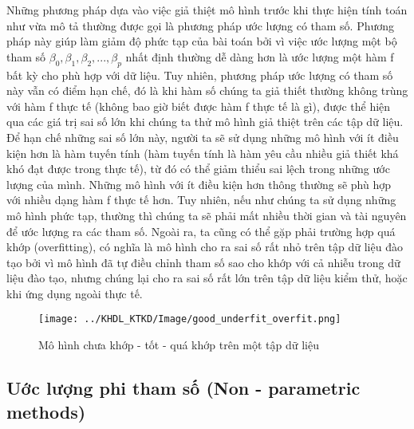 \documentclass[
]{article}
\begin{document}
Những phương pháp dựa vào việc giả thiệt mô hình trước khi thực hiện tính toán như vừa mô tả thường được gọi là phương pháp ước lượng có tham số. Phương pháp này giúp làm giảm độ phức tạp của bài toán bởi vì việc ước lượng một bộ tham số \(\beta_0, \beta_1, \beta_2, ... , \beta_p\) nhất định thường dễ dàng hơn là ước lượng một hàm f bất kỳ cho phù hợp với dữ liệu. Tuy nhiên, phương pháp ước lượng có tham số này vẫn có điểm hạn chế, đó là khi hàm số chúng ta giả thiết thường không trùng với hàm f thực tế (không bao giờ biết được hàm f thực tế là gì), được thể hiện qua các giá trị sai số lớn khi chúng ta thử mô hình giả thiệt trên các tập dữ liệu. Để hạn chế những sai số lớn này, người ta sẽ sử dụng những mô hình với ít điều kiện hơn là hàm tuyến tính (hàm tuyến tính là hàm yêu cầu nhiều giả thiết khá khó đạt được trong thực tế), từ đó có thể giảm thiểu sai lệch trong những ước lượng của mình. Những mô hình với ít điều kiện hơn thông thường sẽ phù hợp với nhiều dạng hàm f thực tế hơn. Tuy nhiên, nếu như chúng ta sử dụng những mô hình phức tạp, thường thì chúng ta sẽ phải mất nhiều thời gian và tài nguyên để ước lượng ra các tham số. Ngoài ra, ta cũng có thể gặp phải trường hợp quá khớp (overfitting), có nghĩa là mô hình cho ra sai số rất nhỏ trên tập dữ liệu đào tạo bởi vì mô hình đã tự điều chỉnh tham số sao cho khớp với cả nhiễu trong dữ liệu đào tạo, nhưng chúng lại cho ra sai số rất lớn trên tập dữ liệu kiểm thử, hoặc khi ứng dụng ngoài thực tế.

\begin{figure}
\centering
\texttt{[image: ../KHDL\_KTKD/Image/good\_underfit\_overfit.png]}
\caption{Mô hình chưa khớp - tốt - quá khớp trên một tập dữ liệu}
\end{figure}

\hypertarget{uux1edbc-lux1b0ux1ee3ng-phi-tham-sux1ed1-non---parametric-methods}{%
\subsection{Uớc lượng phi tham số (Non - parametric methods)}\label{uux1edbc-lux1b0ux1ee3ng-phi-tham-sux1ed1-non---parametric-methods}}
\end{document}
